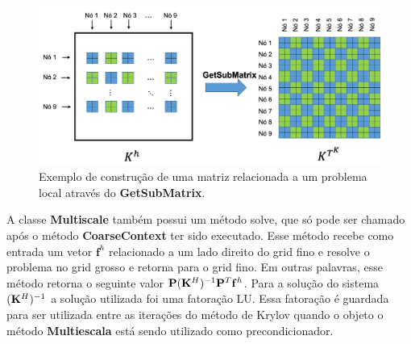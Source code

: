 \begin{figure}[!htbp]
\centering
\includegraphics[width=\textwidth]{chap07/figs/submatrix.png}
\caption{Exemplo de construção de uma matriz relacionada a um problema local através do \textbf{GetSubMatrix}.}
\label{fig:submatrix}
\end{figure}


A classe \textbf{Multiscale} também possui um método solve, que só pode ser chamado após o método \textbf{CoarseContext} ter sido executado. Esse método recebe como entrada um vetor $\mathbf{f}^h$ relacionado a um lado direito do grid fino e resolve o problema no grid grosso e retorna para o grid fino. Em outras palavras, esse método retorna o seguinte valor $\mathbf{P}(\mathbf{K}^H)^{-1}\mathbf{P}^T \mathbf{f}^h$. Para a solução do sistema $(\mathbf{K}^H)^{-1}$ a solução utilizada foi uma fatoração LU. Essa fatoração é guardada para ser utilizada entre as iterações do método de Krylov quando o objeto o método \textbf{Multiescala} está sendo utilizado como precondicionador.

                                                                                   